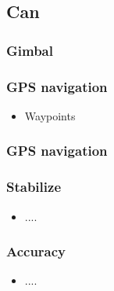 \subsection{Can}

\begin{frame}
\frametitle{Gimbal}

  
\end{frame}




\begin{frame}
\frametitle{GPS navigation}

  \begin{itemize}
    \item Waypoints    
  \end{itemize}
  
\end{frame}


\begin{frame}
\frametitle{GPS navigation}

  
\end{frame}




\begin{frame}
\frametitle{Stabilize}

  \begin{itemize}
    \item ....    
  \end{itemize}
  
\end{frame}




\begin{frame}
\frametitle{Accuracy}

  \begin{itemize}
    \item ....    
  \end{itemize}
  
\end{frame}





